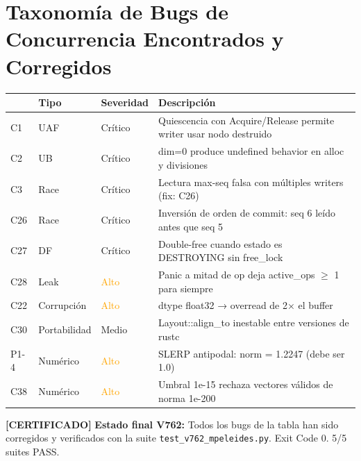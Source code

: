 \section{Taxonomía de Bugs de Concurrencia Encontrados y Corregidos}

\begin{tabular}{llll}}
\hline
\textbf{Ciclo} & \textbf{Tipo} & \textbf{Severidad} & \textbf{Descripción} \\
\hline
C1 & UAF & \textcolor{polydimred}{Crítico} & Quiescencia con Acquire/Release permite writer usar nodo destruido \\
C2 & UB & \textcolor{polydimred}{Crítico} & dim=0 produce undefined behavior en alloc y divisiones \\
C3 & Race & \textcolor{polydimred}{Crítico} & Lectura max-seq falsa con múltiples writers (fix: C26) \\
C26 & Race & \textcolor{polydimred}{Crítico} & Inversión de orden de commit: seq 6 leído antes que seq 5 \\
C27 & DF & \textcolor{polydimred}{Crítico} & Double-free cuando estado es DESTROYING sin free\_lock \\
C28 & Leak & \textcolor{orange}{Alto} & Panic a mitad de op deja active\_ops $\ge$ 1 para siempre \\
C22 & Corrupción & \textcolor{orange}{Alto} & dtype float32 → overread de 2× el buffer \\
C30 & Portabilidad & \textcolor{polydimgold}{Medio} & Layout::align\_to inestable entre versiones de rustc \\
P1-4 & Numérico & \textcolor{orange}{Alto} & SLERP antipodal: norm = 1.2247 (debe ser 1.0) \\
C38 & Numérico & \textcolor{orange}{Alto} & Umbral 1e-15 rechaza vectores válidos de norma 1e-200 \\
\hline


\end{tabular}

\textbf{[CERTIFICADO]} 
\textbf{Estado final V762:} Todos los bugs de la tabla han sido corregidos y verificados
con la suite \texttt{test\_v762\_mpeleides.py}. Exit Code 0. 5/5 suites PASS.

